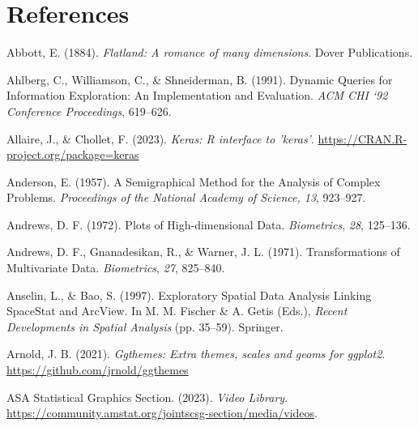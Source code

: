 \documentclass[
  letterpaper,
]{krantz}
\newlength{\cslhangindent}
\newlength{\cslentryspacingunit} %
\newenvironment{CSLReferences}[2] %
 {%
  \setlength{\parindent}{0pt}
  \ifodd #1
  \let\oldpar\par
  \def\par{\hangindent=\cslhangindent\oldpar}
  \fi
  \setlength{\parskip}{#2\cslentryspacingunit}
 }%
 {}
\begin{document}

\hypertarget{references}{%
\chapter*{References}\label{references}}


\hypertarget{refs}{}
\begin{CSLReferences}{1}{0}
\leavevmode{}%
Abbott, E. (1884). \emph{Flatland: A romance of many dimensions}. Dover
Publications.

\leavevmode{}%
Ahlberg, C., Williamson, C., \& Shneiderman, B. (1991). Dynamic
{Q}ueries for {I}nformation {E}xploration: {A}n {I}mplementation and
{E}valuation. \emph{ACM CHI `92 Conference Proceedings}, 619--626.

\leavevmode{}%
Allaire, J., \& Chollet, F. (2023). \emph{Keras: R interface to
'keras'}. \url{https://CRAN.R-project.org/package=keras}

\leavevmode{}%
Anderson, E. (1957). A {S}emigraphical {M}ethod for the {A}nalysis of
{C}omplex {P}roblems. \emph{Proceedings of the National Academy of
Science, 13}, 923--927.

\leavevmode{}%
Andrews, D. F. (1972). {P}lots of {H}igh-dimensional {D}ata.
\emph{Biometrics}, \emph{28}, 125--136.

\leavevmode{}%
Andrews, D. F., Gnanadesikan, R., \& Warner, J. L. (1971).
{T}ransformations of {M}ultivariate {D}ata. \emph{Biometrics},
\emph{27}, 825--840.

\leavevmode{}%
Anselin, L., \& Bao, S. (1997). {E}xploratory {S}patial {D}ata
{A}nalysis {L}inking {S}pace{S}tat and {A}rc{V}iew. In M. M. Fischer \&
A. Getis (Eds.), \emph{{R}ecent {D}evelopments in {S}patial {A}nalysis}
(pp. 35--59). Springer.

\leavevmode{}%
Arnold, J. B. (2021). \emph{Ggthemes: Extra themes, scales and geoms for
ggplot2}. \url{https://github.com/jrnold/ggthemes}

\leavevmode{}%
ASA Statistical Graphics Section. (2023). \emph{Video {L}ibrary}.
\url{https://community.amstat.org/jointscsg-section/media/videos}.


\end{CSLReferences}
\end{document}
